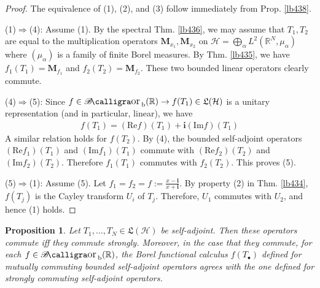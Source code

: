 \documentclass[12pt,b5paper,notitlepage]{article}
\theoremstyle{definition}
\theoremstyle{plain}
\newtheorem{pp}[df]{Proposition}
\DeclareMathOperator{\Borb}{{\mathscr{B}\text{\kern -2pt {\calligra\large or}}\,}_{\mathrm b}}
\newcommand{\fk}{\mathfrak}
\newcommand{\im}{\mathbf{i}}
\newcommand{\blt}{\bullet}
\newcommand{\Rbb}{\mathbb R}
\newcommand{\Real}{\mathrm{Re}}
\newcommand{\Imag}{\mathrm{Im}}
\newcommand{\MH}{\mathcal H}
\newcommand{\Mbf}{\mathbf M}
\numberwithin{equation}{section}
\begin{document}
\begin{proof}
The equivalence of (1), (2), and (3) follow immediately from Prop. \ref{lb438}. 


(1)$\Rightarrow$(4): Assume (1). By the spectral Thm. \ref{lb436}, we may assume that $T_1,T_2$ are equal to the multiplication operators $\Mbf_{x_1},\Mbf_{x_2}$ on $\MH=\bigoplus_\alpha L^2(\Rbb^N,\mu_\alpha)$ where $(\mu_\alpha)$ is a family of finite Borel measures. By Thm. \ref{lb435}, we have $f_1(T_1)=\Mbf_{f_1}$ and $f_2(T_2)=\Mbf_{f_2}$. These two bounded linear operators clearly commute.



(4)$\Rightarrow$(5): Since $f\in\Borb(\Rbb)\rightarrow f(T_1)\in\fk L(\MH)$ is a unitary representation (and in particular, linear), we have
\begin{align*}
f(T_1)=(\Real f)(T_1)+\im(\Imag f)(T_1)
\end{align*}
A similar relation holds for $f(T_2)$. By (4), the bounded self-adjoint operators $(\Real f_1)(T_1)$ and $(\Imag f_1)(T_1)$ commute with $(\Real f_2)(T_2)$ and $(\Imag f_2)(T_2)$. Therefore $f_1(T_1)$ commutes with $f_2(T_2)$. This proves (5). 



(5)$\Rightarrow$(1): Assume (5). Let $f_1=f_2=f:=\frac{x-\im}{x+\im}$. By property (2) in Thm. \ref{lb434}, $f(T_j)$ is the Cayley transform $U_i$ of $T_j$. Therefore, $U_1$ commutes with $U_2$, and hence (1) holds.
\end{proof}


\begin{pp}
Let $T_1,\dots,T_N\in\fk L(\MH)$ be self-adjoint. Then these operators commute iff they commute strongly. Moreover, in the case that they commute, for each $f\in\Borb(\Rbb)$, the Borel functional calculus $f(T_\blt)$ defined for mutually commuting bounded self-adjoint operators agrees with the one defined for strongly commuting self-adjoint operators.
\end{pp}
\end{document}
